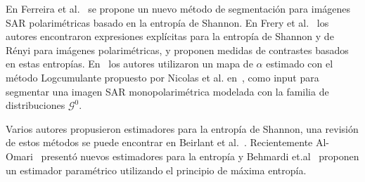\documentclass[11pt]{article}
\begin{document}
En Ferreira et al.~\cite{Ferreira2020} se propone un nuevo método de segmentación para imágenes SAR polarimétricas basado en la entropía de Shannon. En Frery et al.~\cite{Frery2012} los autores encontraron expresiones explícitas para la entropía de Shannon y de Rényi para imágenes polarimétricas, y proponen medidas de contrastes basados en estas entropías. En~\cite{Rodrigues2016} los autores utilizaron un mapa de $\alpha$ estimado con el método Logcumulante propuesto por Nicolas et al. en~\cite{Nicolas2010}, como input para segmentar una imagen SAR monopolarimétrica modelada con la familia de distribuciones $\mathcal{G}^0$.

Varios autores propusieron estimadores para la entropía de Shannon, una revisión de estos métodos se puede encontrar en Beirlant et al.~\cite{Beirlant1997}. Recientemente Al-Omari~\cite{AlOmari2013} presentó nuevos estimadores para la entropía y Behmardi et.al~\cite{Behmardi2011} proponen un estimador paramétrico utilizando el principio de máxima entropía. 



\end{document}
